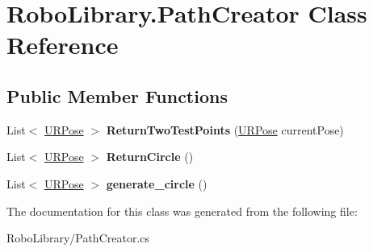 \hypertarget{class_robo_library_1_1_path_creator}{}\section{Robo\+Library.\+Path\+Creator Class Reference}
\label{class_robo_library_1_1_path_creator}
\subsection*{Public Member Functions}
\begin{DoxyCompactItemize}
\item 
\hypertarget{class_robo_library_1_1_path_creator_a4d9db7f14e09ff2cf263cbfd4120dd19}{}\label{class_robo_library_1_1_path_creator_a4d9db7f14e09ff2cf263cbfd4120dd19} 
List$<$ \hyperlink{class_robo_library_1_1_u_r_pose}{U\+R\+Pose} $>$ {\bfseries Return\+Two\+Test\+Points} (\hyperlink{class_robo_library_1_1_u_r_pose}{U\+R\+Pose} current\+Pose)
\item 
\hypertarget{class_robo_library_1_1_path_creator_a1e98e0454508db507fdc4552bc8b26c7}{}\label{class_robo_library_1_1_path_creator_a1e98e0454508db507fdc4552bc8b26c7} 
List$<$ \hyperlink{class_robo_library_1_1_u_r_pose}{U\+R\+Pose} $>$ {\bfseries Return\+Circle} ()
\item 
\hypertarget{class_robo_library_1_1_path_creator_ad16f16cc4a694df8cb142eb71b48a60c}{}\label{class_robo_library_1_1_path_creator_ad16f16cc4a694df8cb142eb71b48a60c} 
List$<$ \hyperlink{class_robo_library_1_1_u_r_pose}{U\+R\+Pose} $>$ {\bfseries generate\+\_\+circle} ()
\end{DoxyCompactItemize}


The documentation for this class was generated from the following file\+:\begin{DoxyCompactItemize}
\item 
Robo\+Library/Path\+Creator.\+cs\end{DoxyCompactItemize}
